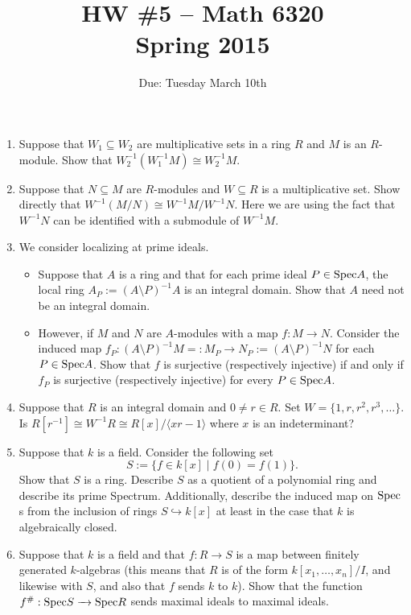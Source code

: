 \documentclass[11pt]{amsart}
\theoremstyle{theorem}
\renewcommand{\to}[1][]{\xrightarrow{\ #1\ }}
\newcommand{\Spec}{\textnormal{Spec}}
\begin{document}
\title{HW \#5 -- Math 6320\\Spring 2015}
\author{Due: Tuesday March 10th}
\maketitle

\begin{enumerate}
\item Suppose that $W_1 \subseteq W_2$ are multiplicative sets in a ring $R$ and $M$ is an $R$-module.  Show that $W_2^{-1}(W_1^{-1} M) \cong W_2^{-1} M$.
\item Suppose that $N \subseteq M$ are $R$-modules and $W \subseteq R$ is a multiplicative set.  Show directly that $W^{-1}(M/N) \cong W^{-1} M / W^{-1}N$. Here we are using the fact that $W^{-1} N$ can be identified with a submodule of $W^{-1} M$.
\item  We consider localizing at prime ideals.
   \begin{itemize}
       \item[(a)]  Suppose that $A$ is a ring and that for each prime ideal $P \in \Spec A$, the local ring $A_P := (A \setminus P)^{-1} A$ is an integral domain.  Show that $A$ need not be an integral domain.
       \item[(b)]  However, if $M$ and $N$ are $A$-modules with a map $f : M \to N$.  Consider the induced map $f_P : (A \setminus P)^{-1} M =: M_P \to N_P := (A \setminus P)^{-1} N$ for each $P \in \Spec A$.  Show that $f$ is surjective (respectively injective) if and only if $f_P$ is surjective (respectively injective) for every $P \in \Spec A$.
       \end{itemize}
   \item Suppose that $R$ is an integral domain and $0 \neq r \in R$.  Set $W = \{1, r, r^2, r^3, \ldots\}$.  Is $R[r^{-1}] \cong W^{-1}R \cong R[x]/\langle xr - 1 \rangle$ where $x$ is an indeterminant?
   \item Suppose that $k$ is a field.  Consider the following set
\[
S := \{ f \in k[x] \;|\; f(0) = f(1) \}.
\]
Show that $S$ is a ring.
Describe $S$ as a quotient of a polynomial ring and describe its prime Spectrum.  Additionally, describe the induced map on $\Spec$s from the inclusion of rings $S \hookrightarrow k[x]$ at least in the case that $k$ is algebraically closed.
\item Suppose that $k$ is a field and that $f : R \to S$ is a map between finitely generated $k$-algebras (this means that $R$ is of the form $k[x_1, \dots, x_n]/I$, and likewise with $S$, and also that $f$ sends $k$ to $k$).  Show that the function $f^\# : \Spec S \to \Spec R$ sends maximal ideals to maximal ideals.  

\end{enumerate}
\end{document}
